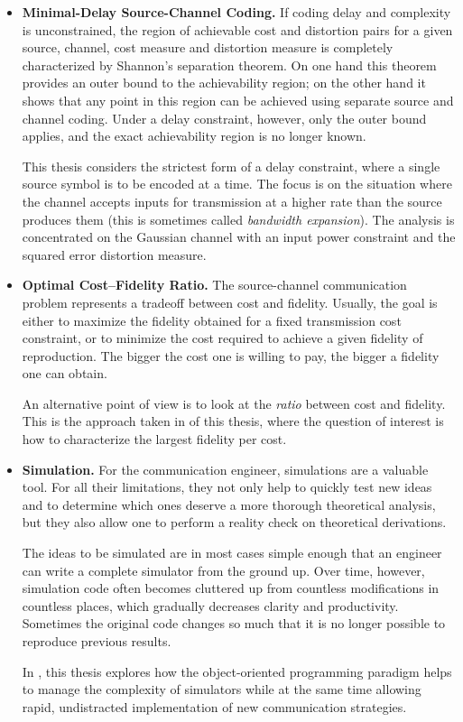 \begin{itemize}

  \item \textbf{Minimal-Delay Source-Channel Coding.} If coding delay and
    complexity is unconstrained, the region of achievable cost and distortion
    pairs for a given source, channel, cost measure and distortion measure is
    completely characterized by Shannon's separation theorem. On one hand this
    theorem provides an outer bound to the achievability region; on the other
    hand it shows that any point in this region can be achieved using separate
    source and channel coding. Under a delay constraint, however, only the outer
    bound applies, and the exact achievability region is no longer known. 

    This thesis considers the strictest form of a delay constraint, where a
    single source symbol is to be encoded at a time. The focus is
    on the situation where the channel accepts inputs for transmission at a
    higher rate than the source produces them (this is sometimes called
    \emph{bandwidth expansion}). The analysis is concentrated on the Gaussian
    channel with an input power constraint and the squared error distortion
    measure. 

  \item \textbf{Optimal Cost--Fidelity Ratio.} The source-channel communication
    problem represents a tradeoff between cost and fidelity. Usually, the goal
    is either to maximize the fidelity obtained for a fixed transmission cost
    constraint, or to minimize the cost required to achieve a given fidelity of
    reproduction. The bigger the cost one is willing to pay, the bigger a
    fidelity one can obtain. 

    An alternative point of view is to look at the \emph{ratio} between cost and
    fidelity. This is the approach taken in  of this thesis,
    where the question of interest is how to characterize the largest fidelity
    per cost.

  \item \textbf{Simulation.} For the communication engineer, simulations are a
    valuable tool. For all their limitations, they not only help to quickly test
    new ideas and to determine which ones deserve a more thorough theoretical
    analysis, but they also allow one to perform a reality check on theoretical
    derivations.

    The ideas to be simulated are in most cases simple enough that an engineer
    can write a complete simulator from the ground up. Over time, however,
    simulation code often becomes cluttered up from countless modifications in
    countless places, which gradually decreases clarity and productivity.
    Sometimes the original code changes so much that it is no longer possible to
    reproduce previous results.

    In , this thesis explores how the object-oriented
    programming paradigm helps to manage the complexity of simulators while at
    the same time allowing rapid, undistracted implementation of new
    communication strategies. 

\end{itemize}


